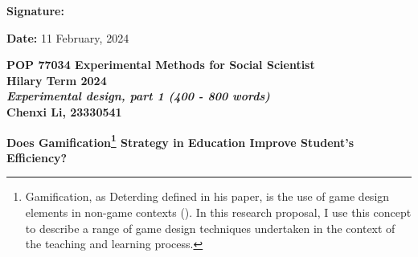 \documentclass[12pt]{article} %
\begin{document}
\vspace{.7cm}


\begin{flushleft}
	\begin{minipage}{0.5\linewidth}
		\textbf{Signature:}
	\end{minipage}
\end{flushleft}

\vspace{.3cm}

\noindent \textbf{Date: } 11 February, 2024

\newpage
\begin{center}
	\textbf{POP 77034 Experimental Methods for Social Scientist}\\
	\textbf{Hilary Term 2024}\\
	\textbf{\textit{Experimental design, part 1 (400 - 800 words)}} \\
	\vspace{.3cm}
	\textbf{Chenxi Li, 23330541}
\end{center}

\vspace{.3cm}

\noindent \textbf{Does Gamification\footnote{Gamification, as Deterding defined in his paper, is the use of game design elements in non-game contexts (\cite{deterding2011game}). In this research proposal, I use this concept to describe a range of game design techniques undertaken in the context of the teaching and learning process.} Strategy in Education Improve Student's Efficiency?}\\
\end{document}
